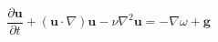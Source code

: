     \begin{center}
        \begin{equation*}
            \frac{\partial{\mathbf{u}}}{\partial{t}} + (\mathbf{u} \cdot \nabla)\mathbf{u} - \nu \nabla^2 \mathbf{u} = - \nabla \omega + \mathbf{g}
        \end{equation*}
    \end{center}
